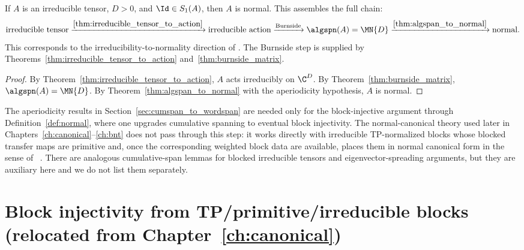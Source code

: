 \begin{theorem}%
    \label{thm:irred_tensor_aperiodic_normal}
    \leanok
    If $A$ is an irreducible tensor, $D > 0$,
    and $\Id \in S_1(A)$, then $A$ is normal.
    This assembles the full chain:
    \[
        \text{irreducible tensor}
        \xrightarrow{\ref{thm:irreducible_tensor_to_action}}
        \text{irreducible action}
        \xrightarrow{\text{Burnside}}
        \algspn(A) = \MN{D}
        \xrightarrow{\ref{thm:algspan_to_normal}}
        \text{normal}.
    \]
    This corresponds to the irreducibility-to-normality direction of
    \cite[Proposition~3]{Sanz2010Quantum}.
    The Burnside step is supplied by
    Theorems~\ref{thm:irreducible_tensor_to_action}
    and~\ref{thm:burnside_matrix}.
\end{theorem}

\begin{proof}\leanok
    By Theorem~\ref{thm:irreducible_tensor_to_action},
    $A$ acts irreducibly on $\C^D$.
    By Theorem~\ref{thm:burnside_matrix},
    $\algspn(A) = \MN{D}$.
    By Theorem~\ref{thm:algspan_to_normal} with the
    aperiodicity hypothesis, $A$ is normal.
\end{proof}

\begin{remark}\label{rem:d1_bypasses_aperiodicity}
    The aperiodicity results in Section~\ref{sec:cumspan_to_wordspan} are needed only for the
    block-injective argument through Definition~\ref{def:normal}, where one upgrades cumulative
    spanning to eventual block injectivity. The normal-canonical theory used later in
    Chapters~\ref{ch:canonical}--\ref{ch:bnt} does not pass through this step:
    it works directly with irreducible TP-normalized blocks whose blocked transfer maps
    are primitive and, once the corresponding weighted block data are available,
    places them in normal canonical form in the sense of~%
    \cite{Cirac2016MPDO_arXiv}. There are analogous cumulative-span lemmas for
    blocked irreducible tensors and eigenvector-spreading arguments, but they are
    auxiliary here and we do not list them separately.
\end{remark}

\section{Block injectivity from TP/primitive/irreducible blocks (relocated from Chapter~\ref{ch:canonical})}%
\label{sec:ch07_block_inj_from_tp_primitive_irred}

